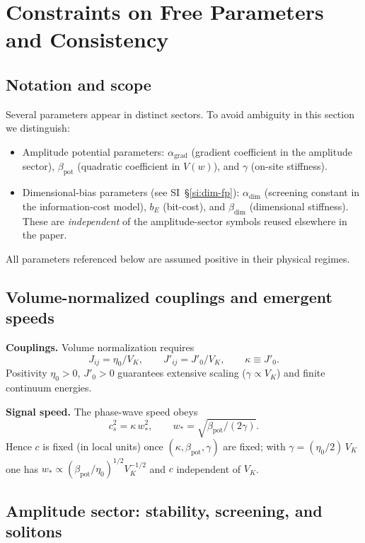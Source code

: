 \documentclass[11pt]{article}
\begin{document}
\section{Constraints on Free Parameters and Consistency}

\subsection{Notation and scope}

Several parameters appear in distinct sectors. To avoid ambiguity in this section we distinguish:
\begin{itemize}
  \item Amplitude potential parameters: $\alpha_{\mathrm{grad}}$ (gradient coefficient in the amplitude sector), $\beta_{\mathrm{pot}}$ (quadratic coefficient in $V(w)$), and $\gamma$ (on-site stiffness).
  \item Dimensional-bias parameters (see SI~\S\ref{si:dim-fp}): $\alpha_{\mathrm{dim}}$ (screening constant in the information-cost model), $b_E$ (bit-cost), and $\beta_{\mathrm{dim}}$ (dimensional stiffness). These are \emph{independent} of the amplitude-sector symbols reused elsewhere in the paper.
\end{itemize}

All parameters referenced below are assumed positive in their physical regimes.

\subsection{Volume-normalized couplings and emergent speeds}

\textbf{Couplings.} Volume normalization requires
\begin{equation}
J_{ij} = \eta_0/V_K,\qquad J'_{ij} = J'_0/V_K,\qquad \kappa \equiv J'_0.
\end{equation}
Positivity $\eta_0>0$, $J'_0>0$ guarantees extensive scaling ($\gamma \propto V_K$) and finite continuum energies.

\textbf{Signal speed.} The phase-wave speed obeys
\begin{equation}
c_s^2 = \kappa\, w_*^2,\qquad w_* = \sqrt{\beta_{\mathrm{pot}}/(2\gamma)}.
\end{equation}
Hence $c$ is fixed (in local units) once $(\kappa,\beta_{\mathrm{pot}},\gamma)$ are fixed; with $\gamma=(\eta_0/2)\,V_K$ one has $w_* \propto (\beta_{\mathrm{pot}}/\eta_0)^{1/2} V_K^{-1/2}$ and $c$ independent of $V_K$.

\subsection{Amplitude sector: stability, screening, and solitons}
\end{document}

